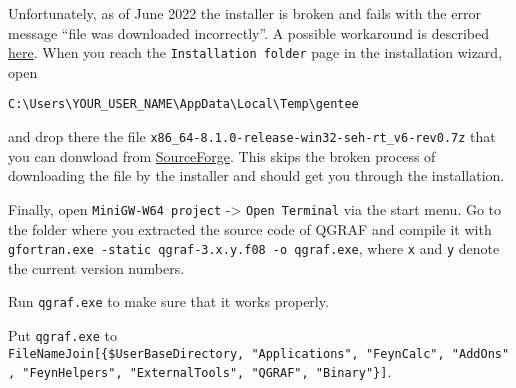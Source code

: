 \documentclass[../FeynHelpersManual.tex]{subfiles}
\begin{document}
Unfortunately, as of June 2022 the installer is broken and fails with
the error message ``file was downloaded incorrectly''. A possible
workaround is described
\href{https://sourceforge.net/p/mingw-w64/support-requests/125/}{here}.
When you reach the \texttt{Installation folder} page in the installation
wizard, open

\begin{verbatim}
C:\Users\YOUR_USER_NAME\AppData\Local\Temp\gentee
\end{verbatim}

and drop there the file
\texttt{x86_64-8.1.0-release-win32-seh-rt_v6-rev0.7z} that you can
donwload from
\href{https://sourceforge.net/projects/mingw-w64/files/Toolchains\%20targetting\%20Win64/Personal\%20Builds/mingw-builds/8.1.0/threads-posix/seh/x86_64-8.1.0-release-posix-seh-rt_v6-rev0.7z}{SourceForge}.
This skips the broken process of downloading the file by the installer
and should get you through the installation.

Finally, open \texttt{MiniGW-W64 project} -\textgreater{}
\texttt{Open Terminal} via the start menu. Go to the folder where you
extracted the source code of QGRAF and compile it with
\texttt{gfortran.exe -static qgraf-3.x.y.f08 -o qgraf.exe}, where
\texttt{x} and \texttt{y} denote the current version numbers.

Run \texttt{qgraf.exe} to make sure that it works properly.

Put \texttt{qgraf.exe} to
\texttt{FileNameJoin[\allowbreak{}\{\allowbreak{}\$UserBaseDirectory,\ \allowbreak{}"Applications",\ \allowbreak{}"FeynCalc",\ \allowbreak{}"AddOns",\ \allowbreak{}"FeynHelpers",\ \allowbreak{}"ExternalTools",\ \allowbreak{}"QGRAF",\ \allowbreak{}"Binary"\}]}.
\end{document}
